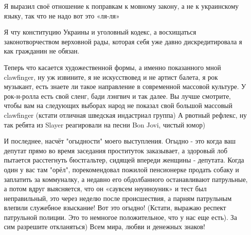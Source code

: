 Я выразил своё отношение к поправкам к мовному закону, а не к украинскому языку, так что не надо вот это «ля-ля» 

Я чту конституцию Украины и уголовный кодекс, а восхищаться законотворчеством
верховной рады, которая себя уже давно дискредитировала я как гражданин не
обязан. 

Теперь что касается художественной формы, а именно показанного мной clawfinger,
ну уж извините, я не искусствовед и не артист балета, я рок музыкант, есть
знаете ли такое направление в современной массовой культуре. У рок-н-ролла есть
свой сленг, бади лэнгвич и так далее. Вы лучше смотрите, чтобы вам на следующих
выборах народ не показал свой большой массовый clawfinger (кстати отличная
шведская индастриал группа) А рвотный рефлекс, ну так ребята из Slayer
реагировали на песни Bon Jovi, чистый юмор) 

И последнее, насчёт "огыдности" моего выступления. Огыдно - это когда ваш
депутат прямо во время заседания проституток заказывает, а здоровый лоб
пытается расстегнуть бюстгальтер, сидящей впереди женщины - депутата. Когда
один у вас там "орёл", порекомендовал пожилой пенсионерке продать собаку и
заплатить за коммуналку, а недавно его обдолбанного останавливают патрульные,
а потом вдруг выясняется, что он  «саувсем неуиноуник» и тест был
неправильный, это через неделю после происшествия, а парням патрульным влепили
служебное взыскание! Вот это огыдно! (Кстати, выражаю респект патрульной
полиции. Это то немногое положительное, что у нас еще есть). За сим разрешите
откланяться)  Всем мира, любви и денежных знаков!
